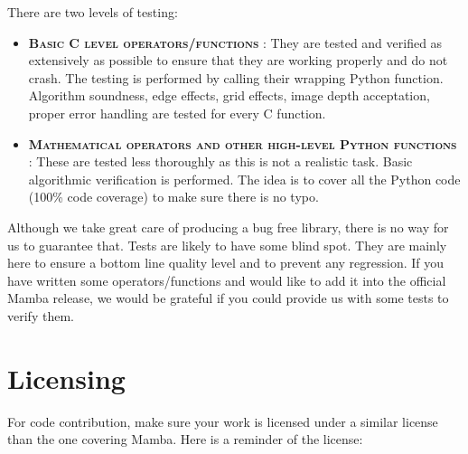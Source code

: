 \documentclass[a4paper,10pt,oneside]{article}
\begin{document}
There are two levels of testing:

\begin{itemize}
\item \textbf{\textsc{Basic C level operators/functions}} :
They are tested and verified as extensively as possible to ensure that they
are working properly and do not crash. The testing is performed by calling their
wrapping Python function. Algorithm soundness, edge effects,
grid effects, image depth acceptation, proper error handling are tested for every
C function.
\item \textbf{\textsc{Mathematical operators and other high-level Python functions}} :
These are tested less thoroughly as this is not a realistic task. Basic
algorithmic verification is performed. The idea is to cover all the Python code
(100\% code coverage) to make sure there is no typo.
\end{itemize}

Although we take great care of producing a bug free library, there is no way
for us to guarantee that. Tests are likely to have some blind spot. They are
mainly here to ensure a bottom line quality level and to prevent any regression.
If you have written some operators/functions and would like to add it into the
official Mamba release, we would be grateful if you could provide us with some
tests to verify them.

\section{Licensing}

\label{cha:Licensing}

For code contribution, make sure your work is licensed under a similar
license than the one covering Mamba. Here is a reminder of the license:

\end{document}
